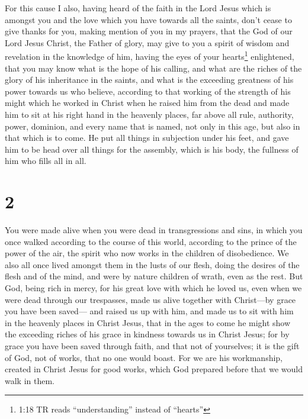  For this cause I also, having heard of the faith in the
Lord Jesus which is amongst you and the love which you have towards all
the saints,  don't cease to give thanks for you, making
mention of you in my prayers,  that the God of our Lord
Jesus Christ, the Father of glory, may give to you a spirit of wisdom
and revelation in the knowledge of him,  having the eyes of
your hearts\footnote{1:18 TR reads ``understanding'' instead of
  ``hearts''} enlightened, that you may know what is the hope of his
calling, and what are the riches of the glory of his inheritance in the
saints,  and what is the exceeding greatness of his power
towards us who believe, according to that working of the strength of his
might  which he worked in Christ when he raised him from
the dead and made him to sit at his right hand in the heavenly places,
 far above all rule, authority, power, dominion, and every
name that is named, not only in this age, but also in that which is to
come.  He put all things in subjection under his feet, and
gave him to be head over all things for the assembly, 
which is his body, the fullness of him who fills all in all.

\hypertarget{section-1}{%
\section{2}\label{section-1}}

 You were made alive when you were dead in transgressions
and sins,  in which you once walked according to the course
of this world, according to the prince of the power of the air, the
spirit who now works in the children of disobedience.  We
also all once lived amongst them in the lusts of our flesh, doing the
desires of the flesh and of the mind, and were by nature children of
wrath, even as the rest.  But God, being rich in mercy, for
his great love with which he loved us,  even when we were
dead through our trespasses, made us alive together with Christ---by
grace you have been saved---  and raised us up with him, and
made us to sit with him in the heavenly places in Christ Jesus,
 that in the ages to come he might show the exceeding riches
of his grace in kindness towards us in Christ Jesus;  for by
grace you have been saved through faith, and that not of yourselves; it
is the gift of God,  not of works, that no one would boast.
 For we are his workmanship, created in Christ Jesus for
good works, which God prepared before that we would walk in them.

